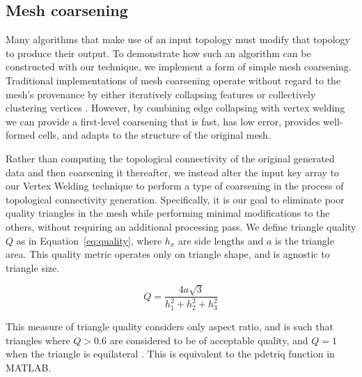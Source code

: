 \documentclass[10pt,journal,cspaper,compsoc]{IEEEtran}
\begin{document}
\subsection{Mesh coarsening}
\label{sec:coarsening}
Many algorithms that make use of an input topology must modify that topology to produce their output. To demonstrate how such an algorithm can be constructed with our technique, we implement a form of simple mesh coarsening. Traditional implementations of mesh coarsening operate without regard to the mesh's provenance by either iteratively collapsing features \cite{Potter2011} or collectively clustering vertices \cite{DeCoro2007}.  However, by combining edge collapsing with vertex welding we can provide a first-level coarsening that is fast, has low error, provides well-formed cells, and adapts to the structure of the original mesh.

Rather than computing the topological connectivity of the original generated data and then coarsening it thereafter, we instead alter the input key array to our Vertex Welding technique to perform a type of coarsening in the process of topological connectivity generation. Specifically, it is our goal to eliminate poor quality triangles in the mesh while performing minimal modifications to the others, without requiring an additional processing pass. We define triangle quality $Q$ as in Equation~\ref{eq:quality}, where $h_x$ are side lengths and $a$ is the triangle area. This quality metric operates only on triangle shape, and is agnostic to triangle size.

\begin{equation}
\label{eq:quality}
	Q = \frac{4a\sqrt{3}}{h_1^2 + h_2^2 + h_3^2}
\end{equation}

This measure of triangle quality considers only aspect ratio, and is such that triangles where $Q > 0.6$ are considered to be of acceptable quality, and $Q = 1$ when the triangle is equilateral \cite{Bank2003}. This is equivalent to the pdetriq function in MATLAB.
\end{document}
